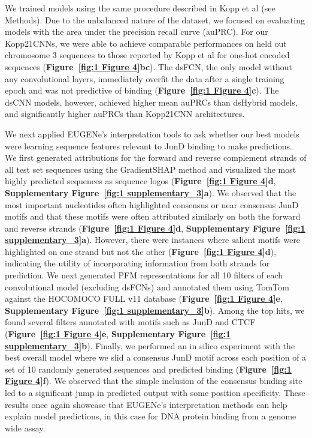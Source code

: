 We trained models using the same procedure described in Kopp et al (see Methods)\cite{Kopp2020-fw}. Due to the unbalanced nature of the dataset, we focused on evaluating models with the area under the precision recall curve (auPRC). For our Kopp21CNNs, we were able to achieve comparable performances on held out chromosome 3 sequences to those reported by Kopp et al for one-hot encoded sequences (\textbf{Figure~\ref{fig:1 Figure 4}b}\textbf{c}). The dsFCN, the only model without any convolutional layers, immediately overfit the data after a single training epoch and was not predictive of binding (\textbf{Figure~\ref{fig:1 Figure 4}c}). The dsCNN models, however, achieved higher mean auPRCs than dsHybrid models, and significantly higher auPRCs than Kopp21CNN architectures.

We next applied EUGENe’s interpretation tools to ask whether our best models were learning sequence features relevant to JunD binding to make predictions. We first generated attributions for the forward and reverse complement strands of all test set sequences using the GradientSHAP\cite{Lundberg2017-hh} method and visualized the most highly predicted sequences as sequence logos (\textbf{Figure~\ref{fig:1 Figure 4}d}, \textbf{Supplementary Figure~\ref{fig:1 supplementary_3}a}). We observed that the most important nucleotides often highlighted consensus or near consensus JunD motifs and that these motifs were often attributed similarly on both the forward and reverse strands (\textbf{Figure~\ref{fig:1 Figure 4}d}, \textbf{Supplementary Figure~\ref{fig:1 supplementary_3}a}). However, there were instances where salient motifs were highlighted on one strand but not the other (\textbf{Figure~\ref{fig:1 Figure 4}d}), indicating the utility of incorporating information from both strands for prediction. We next generated PFM representations for all 10 filters of each convolutional model (excluding dsFCNs) and annotated them using TomTom against the HOCOMOCO FULL v11 database\cite{Kulakovskiy2018-oz} (\textbf{Figure~\ref{fig:1 Figure 4}e}, \textbf{Supplementary Figure~\ref{fig:1 supplementary_3}b}). Among the top hits, we found several filters annotated with motifs such as JunD and CTCF (\textbf{Figure~\ref{fig:1 Figure 4}e}, \textbf{Supplementary Figure~\ref{fig:1 supplementary_3}b}). Finally, we performed an in silico experiment with the best overall model where we slid a consensus JunD motif across each position of a set of 10 randomly generated sequences and predicted binding (\textbf{Figure~\ref{fig:1 Figure 4}f}). We observed that the simple inclusion of the consensus binding site led to a significant jump in predicted output with some position specificity. These results once again showcase that EUGENe’s interpretation methods can help explain model predictions, in this case for DNA protein binding from a genome wide assay.

